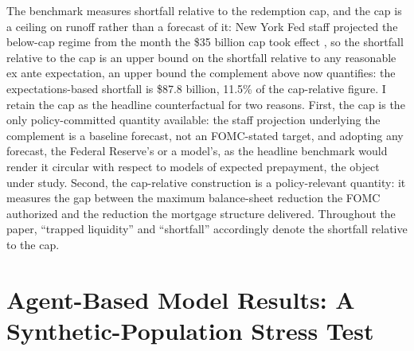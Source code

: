 \documentclass[12pt]{article}
\begin{document}
The benchmark measures shortfall relative to the redemption cap, and the cap is a ceiling on runoff rather than a forecast of it: New York Fed staff projected the below-cap regime from the month the \$35 billion cap took effect \citep{nyfed2022}, so the shortfall relative to the cap is an upper bound on the shortfall relative to any reasonable ex ante expectation, an upper bound the complement above now quantifies: the expectations-based shortfall is \$87.8 billion, 11.5\% of the cap-relative figure. I retain the cap as the headline counterfactual for two reasons. First, the cap is the only policy-committed quantity available: the staff projection underlying the complement is a baseline forecast, not an FOMC-stated target, and adopting any forecast, the Federal Reserve's or a model's, as the headline benchmark would render it circular with respect to models of expected prepayment, the object under study. Second, the cap-relative construction is a policy-relevant quantity: it measures the gap between the maximum balance-sheet reduction the FOMC authorized and the reduction the mortgage structure delivered. Throughout the paper, ``trapped liquidity'' and ``shortfall'' accordingly denote the shortfall relative to the cap.

\section{Agent-Based Model Results: A Synthetic-Population Stress Test}\label{sec:abm}
\end{document}
